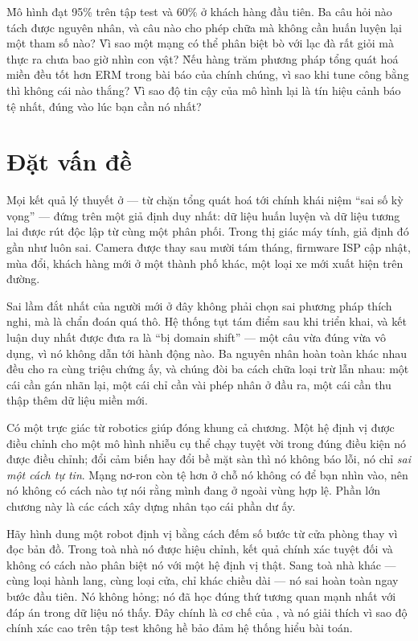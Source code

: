 \documentclass[../../deep_learning.tex]{subfiles}
\begin{document}
\begin{khoigoi}
\h{Mô hình đạt 95\%
 trên tập test và 60\%
ở khách hàng đầu tiên. Ba câu hỏi nào tách được nguyên nhân, và câu nào cho phép chữa mà không cần huấn luyện lại một tham số nào?}
\h{Vì sao một mạng có thể phân biệt bò với lạc đà rất giỏi mà thực ra chưa bao giờ nhìn con vật?}
\h{Nếu hàng trăm phương pháp tổng quát hoá miền đều tốt hơn ERM trong bài báo của chính chúng, vì sao khi tune công bằng thì không cái nào thắng?}
\h{Vì sao độ tin cậy của mô hình lại là tín hiệu cảnh báo tệ nhất, đúng vào lúc bạn cần nó nhất?}
\end{khoigoi}

\section{Đặt vấn đề}
Mọi kết quả lý thuyết ở  --- từ chặn tổng quát hoá tới chính khái niệm ``sai số kỳ vọng'' --- đứng trên một giả định duy nhất: dữ liệu huấn luyện và dữ liệu tương lai được rút độc lập từ cùng một phân phối. Trong thị giác máy tính, giả định đó gần như luôn sai. Camera được thay sau mười tám tháng, firmware ISP cập nhật, mùa đổi, khách hàng mới ở một thành phố khác, một loại xe mới xuất hiện trên đường.

Sai lầm đắt nhất của người mới ở đây không phải chọn sai phương pháp thích nghi, mà là chẩn đoán quá thô. Hệ thống tụt tám điểm sau khi triển khai, và kết luận duy nhất được đưa ra là ``bị domain shift'' --- một câu vừa đúng vừa vô dụng, vì nó không dẫn tới hành động nào. Ba nguyên nhân hoàn toàn khác nhau đều cho ra cùng triệu chứng ấy, và chúng đòi ba cách chữa loại trừ lẫn nhau: một cái cần gán nhãn lại, một cái chỉ cần vài phép nhân ở đầu ra, một cái cần thu thập thêm dữ liệu miền mới.

Có một trực giác từ robotics giúp đóng khung cả chương. Một hệ định vị được điều chỉnh cho một mô hình nhiễu cụ thể chạy tuyệt vời trong đúng điều kiện nó được điều chỉnh; đổi cảm biến hay đổi bề mặt sàn thì nó không báo lỗi, nó chỉ \emph{sai một cách tự tin}. Mạng nơ-ron còn tệ hơn ở chỗ nó không có  để bạn nhìn vào, nên nó không có cách nào tự nói rằng mình đang ở ngoài vùng hợp lệ. Phần lớn chương này là các cách xây dựng nhân tạo cái phần dư ấy.

\begin{trucgiac}
Hãy hình dung một robot định vị bằng cách đếm số bước từ cửa phòng thay vì đọc bản đồ. Trong toà nhà nó được hiệu chỉnh, kết quả chính xác tuyệt đối và không có cách nào phân biệt nó với một hệ định vị thật. Sang toà nhà khác --- cùng loại hành lang, cùng loại cửa, chỉ khác chiều dài --- nó sai hoàn toàn ngay bước đầu tiên. Nó không hỏng; nó đã học đúng thứ tương quan mạnh nhất với đáp án trong dữ liệu nó thấy. Đây chính là cơ chế của , và nó giải thích vì sao độ chính xác cao trên tập test không hề bảo đảm hệ thống hiểu bài toán.
\end{trucgiac}
\end{document}
